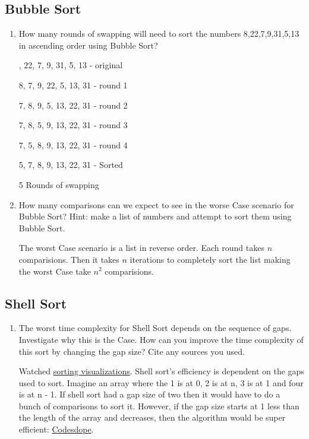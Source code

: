 \documentclass[12pt]{article}
\newenvironment{QandA}{\begin{enumerate}[label=\bfseries\alph*.]\bfseries}
{\end{enumerate}}
\newenvironment{answered}{\par\normalfont}{}
\begin{document}
	\subsection{Bubble Sort}
	\begin{QandA}

	\item How many rounds of swapping will need to sort the numbers 8,22,7,9,31,5,13 in ascending order using Bubble Sort?
		\begin{answered}
			8, 22, 7, 9, 31, 5, 13 - original

			8, 7, 9, 22, 5, 13, 31 - round 1

			7, 8, 9, 5, 13, 22, 31 - round 2

			7, 8, 5, 9, 13, 22, 31 - round 3

			7, 5, 8, 9, 13, 22, 31 - round 4

			5, 7, 8, 9, 13, 22, 31 - Sorted

			5 Rounds of swapping
		\end{answered}

	\item How many comparisons can we expect to see in the worse Case scenario for Bubble Sort? Hint: make a list of numbers and attempt to sort them using Bubble Sort.

		\begin{answered}
			The worst Case scenario is a list in reverse order. Each round takes $n$ comparisions. Then it takes $n$ iterations to completely sort the list making the worst Case take $n^2$ comparisions.
		\end{answered}
	\end{QandA}

	\subsection{Shell Sort}
	\begin{QandA}

	\item The worst time complexity for Shell Sort depends on the sequence of gaps. Investigate why this is the Case. How can you improve the time complexity of this sort by changing the gap size? Cite any sources you used.
		\begin{answered}
			Watched \href{https://www.youtube.com/watch?v=NYWEM7H3iYc\&t=269s}{sorting visualizations}. Shell sort's efficiency is dependent on the gaps used to sort. Imagine an array where the 1 is at 0, 2 is at n, 3 is at 1 and four is at n - 1. If shell sort had a gap size of two then it would have to do a bunch of comparisons to sort it. However, if the gap size starts at 1 less than the length of the array and decreases, then the algorithm would be super efficient: \href{https://www.codesdope.com/blog/article/shell-sort/}{Codesdope}.
		\end{answered}

	\end{QandA}
\end{document}
